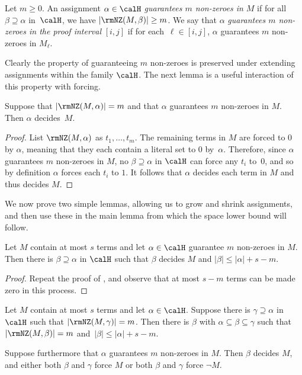 \documentclass{toc}
\begin{document}
\begin{definition}
Let $m\geq 0$. 
An assignment $\alpha \in \calH$ \emph{guarantees $m$ non-zeroes in $M$} 
if for all $\beta \supseteq \alpha$ in~$\calH$, we have
  $|\rmNZ(M, \beta)| \ge m$.
We say that $\alpha$ \emph{guarantees $m$ non-zeroes in the proof interval}
$[i,j]$ if for each~$\ell\in [i,j]$, $\alpha$ {guarantees $m$ non-zeroes in $M_\ell$}.
\end{definition}

Clearly the property of guaranteeing $m$ non-zeroes is preserved
under extending assignments within the family $\calH$. 
The next lemma is a useful interaction of this property with forcing.

 \begin{lemma}
\label{lem:NNZ_fixing}
Suppose that $|\rmNZ(M, \alpha)| = m$ and that $\alpha$ guarantees $m$ 
non-zeroes in $M$.
Then $\alpha$ decides~$M$.
\end{lemma}

\begin{proof}
List $\rmNZ(M, \alpha)$ as $t_1, \dots, t_m$.
The remaining terms in $M$ are forced to $0$ by $\alpha$,
meaning that they each contain a literal set to $0$ by~$\alpha$.
Therefore, since $\alpha$ guarantees $m$ non-zeroes in $M$, 
no $\beta \supseteq \alpha$ in $\calH$ can force any $t_i$ to~$0$, 
and so by definition $\alpha$ forces each $t_i$ to $1$.
It follows that $\alpha$ decides each term in $M$ and thus decides $M$.
\end{proof}

We now prove two simple lemmas, allowing us to grow and shrink assignments,
and then use these in the main lemma from which the space lower bound will follow.

\begin{lemma} \label{lem:gen}
Let $M$ contain at most $s$ terms and let $\alpha \in \calH$ guarantee $m$ non-zeroes in $M$. 
Then there is $\beta \supseteq \alpha$ in $\calH$ such that $\beta$ decides $M$ and $|\beta| \leq |\alpha|+ s - m$. 
\end{lemma}

\begin{proof}
Repeat the proof of ,
and observe that at most $s-m$ terms can be 
made zero in this process.
\end{proof}



\begin{lemma}
\label{lem:loc}
Let $M$ contain at most $s$ terms and let $\alpha \in \calH$. 
Suppose there is $\gamma\supseteq \alpha$ in $\calH$ such that \mbox{$|\rmNZ(M, \gamma)|=m$}. 
Then there is $\beta$ with $\alpha \subseteq \beta \subseteq \gamma$ such that $|\rmNZ(M, \beta)|=m$
and~$|\beta| \leq |\alpha| + s-m$.

Suppose furthermore that $\alpha$ guarantees $m$ non-zeroes in $M$.
Then $\beta$ decides $M$, and either both $\beta$ and $\gamma$ force $M$
or both $\beta$ and $\gamma$ force $\neg M$.
\end{lemma}
\end{document}
